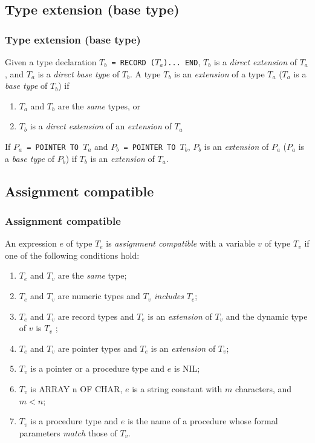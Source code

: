 \ifonline
\subsection{Type extension (base type)}
\else
\subsubsection{Type extension (base type)}
\fi

Given a type declaration {\tt $T_b$ = RECORD ($T_a$)... END},
$T_b$ is a {\em direct extension} of $T_a$,
and $T_a$ is a {\em direct base type} of $T_b$. A type $T_b$ is
an {\em extension} of a type $T_a$ ($T_a$ is a {\em base type} of $T_b$) if
\begin{enumerate}
\item
$T_a$ and $T_b$ are the {\em same} types, or
\item
$T_b$ is a {\em direct extension} of an {\em extension} of $T_a$
\end{enumerate}

If {\tt $P_a$ = POINTER TO $T_a$}
and {\tt $P_b$ = POINTER TO $T_b$}, $P_b$ is an {\em extension} of
$P_a$ ($P_a$ is a {\em base type} of $P_b$)
if $T_b$ is an {\em extension} of $T_a$.

\ifonline
\subsection{Assignment compatible}
\else
\subsubsection{Assignment compatible}
\fi

An expression $e$ of type $T_e$ is {\em assignment compatible} with a variable
$v$ of type $T_v$ if one of the following conditions hold:
\begin{enumerate}
\item
$T_e$ and $T_v$ are the {\em same} type;
\item
$T_e$ and $T_v$ are numeric types and $T_v$ {\em includes} $T_e$;
\item
$T_e$ and $T_v$ are record types and $T_e$ is an {\em extension}
of $T_v$ and the dynamic type of $v$ is $T_v$ ;
\item
$T_e$ and $T_v$ are pointer types and $T_e$ is an {\em extension}
of $T_v$;
\item
$T_v$ is a pointer or a procedure type and $e$ is NIL;
\item
$T_v$ is ARRAY n OF CHAR, $e$ is a string constant with
$m$ characters, and $m < n$;
\item
$T_v$ is a procedure type and $e$ is the name of a procedure
whose formal parameters {\em match} those of $T_v$.
\end{enumerate}

